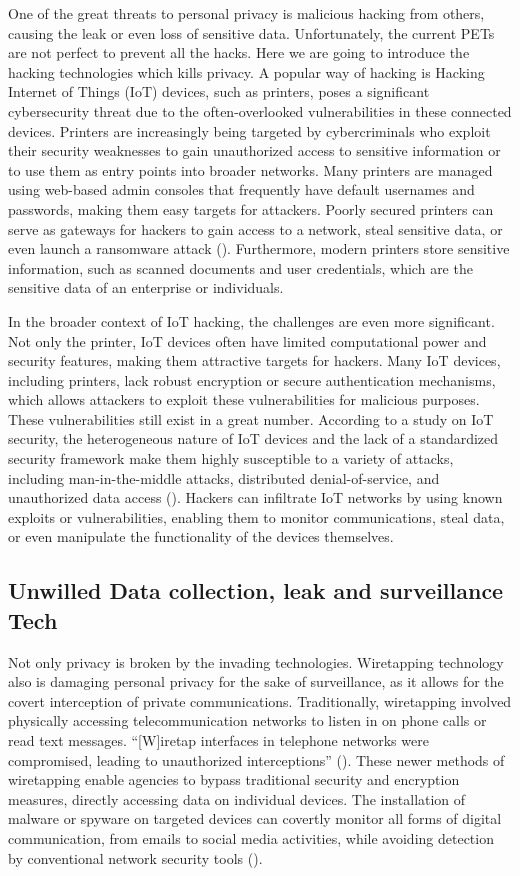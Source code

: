 \documentclass[a4paper,12pt]{article}
\begin{document}
One of the great threats to personal privacy is malicious hacking from others, causing the leak or even loss of sensitive data. Unfortunately, the current PETs are not perfect to prevent all the hacks. Here we are going to introduce the hacking technologies which kills privacy. A popular way of hacking is Hacking Internet of Things (IoT) devices, such as printers, poses a significant cybersecurity threat due to the often-overlooked vulnerabilities in these connected devices. Printers are increasingly being targeted by cybercriminals who exploit their security weaknesses to gain unauthorized access to sensitive information or to use them as entry points into broader networks. Many printers are managed using web-based admin consoles that frequently have default usernames and passwords, making them easy targets for attackers. Poorly secured printers can serve as gateways for hackers to gain access to a network, steal sensitive data, or even launch a ransomware attack (\cite{osibeyond2022printer}). Furthermore, modern printers store sensitive information, such as scanned documents and user credentials, which are the sensitive data of an enterprise or individuals.

In the broader context of IoT hacking, the challenges are even more significant. Not only the printer, IoT devices often have limited computational power and security features, making them attractive targets for hackers. Many IoT devices, including printers, lack robust encryption or secure authentication mechanisms, which allows attackers to exploit these vulnerabilities for malicious purposes. These vulnerabilities still exist in a great number. According to a study on IoT security, the heterogeneous nature of IoT devices and the lack of a standardized security framework make them highly susceptible to a variety of attacks, including man-in-the-middle attacks, distributed denial-of-service, and unauthorized data access (\cite{radanliev2023hacking}). Hackers can infiltrate IoT networks by using known exploits or vulnerabilities, enabling them to monitor communications, steal data, or even manipulate the functionality of the devices themselves.

\subsection{Unwilled Data collection, leak and surveillance Tech}
\onehalfspacing
Not only privacy is broken by the invading technologies. Wiretapping technology also is damaging personal privacy for the sake of surveillance, as it allows for the covert interception of private communications. Traditionally, wiretapping involved physically accessing telecommunication networks to listen in on phone calls or read text messages. “[W]iretap interfaces in telephone networks were compromised, leading to unauthorized interceptions” (\cite{bellovin2012going}). These newer methods of wiretapping enable agencies to bypass traditional security and encryption measures, directly accessing data on individual devices. The installation of malware or spyware on targeted devices can covertly monitor all forms of digital communication, from emails to social media activities, while avoiding detection by conventional network security tools (\cite{bellovin2012going}). 
\end{document}
